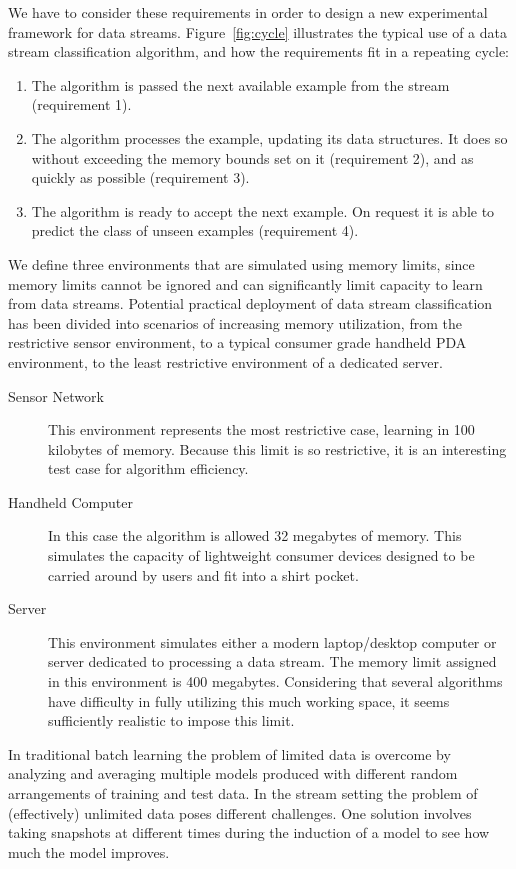 \documentclass[a4paper,12pt,twoside]{book}
\begin{document}
We have to consider these requirements in order to design a new experimental
framework for data streams.
Figure~\ref{fig:cycle} illustrates the typical use of a data stream 
classification algorithm, and how the requirements fit %
in a repeating cycle:
\begin{enumerate}
\item  The algorithm is passed the next available example from the stream
   (requirement 1).
\item  The algorithm processes the example, updating its data structures. It
   does so without exceeding the memory bounds set on it (requirement 2),
   and as quickly as possible (requirement 3).
\item  The algorithm is ready to accept the next example. On request it is
   able to predict the class of unseen examples
   (requirement 4).
\end{enumerate}
\BEGINOMIT
We define three environments that are simulated using memory limits, 
since memory limits cannot be ignored and can significantly limit capacity
to learn from data streams. Potential practical deployment of data stream
classification has been divided into scenarios of increasing memory utilization,
from the restrictive sensor environment, to a typical consumer grade handheld
PDA environment, to the least restrictive environment of a dedicated server.

\begin{description}
\item[Sensor Network] This environment represents the most restrictive case, 
learning in 100 kilobytes of memory. Because this limit is so restrictive,
it is an interesting test case for algorithm efficiency.

\item[Handheld Computer] In this case the algorithm is allowed 32 megabytes of 
memory. This simulates the capacity of lightweight consumer devices designed to
be carried around by users and fit into a shirt pocket.

\item[Server] This environment simulates either a modern laptop/desktop computer
or server dedicated to processing a data stream. The memory limit assigned in 
this environment is 400 megabytes.  Considering that several algorithms have 
difficulty in fully utilizing this much working space, it seems sufficiently 
realistic to impose this limit.

\end{description}
\ENDOMIT
In traditional batch learning the problem of limited data is overcome
by analyzing and averaging multiple models produced with different random
arrangements of training and test data. In the stream setting the problem of
(effectively) unlimited data poses different challenges. One solution involves
taking snapshots at different times during the induction of a model to see how
much the model improves.
\end{document}
